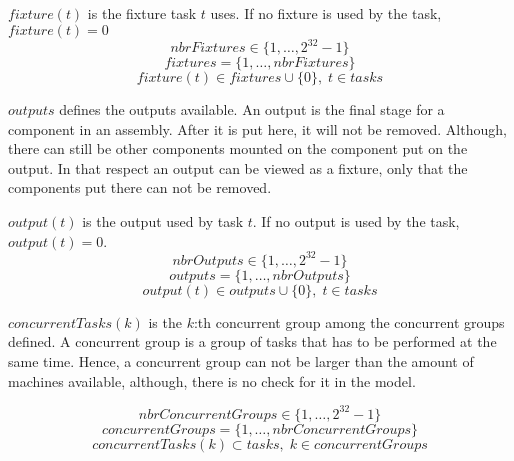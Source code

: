   $fixture(t)$ is the fixture task $t$ uses. If no fixture is used by the task, $fixture(t) = 0$
 \begin{equation}\label{eq:5}
 nbrFixtures \in \{1 , \ldots , 2^{32}-1\}
 \end{equation}
 \begin{equation}\label{eq:15}
 fixtures = \{1 , \ldots , nbrFixtures\}
 \end{equation}
 \begin{equation}\label{eq:24}
 fixture(t) \in fixtures \cup \{0\}, \; t \in tasks
 \end{equation}

  \noindent $outputs$ defines the outputs available. An output is the final stage for a component in an assembly. After it is put here, it will not be removed. Although, there can still be other components mounted on the component put on the output. In that respect an output can be viewed as a fixture, only that the components put there can not be removed.
 
 $output(t)$ is the output used by task $t$. If no output is used by the task, $output(t) = 0$.
 \begin{equation}\label{eq:7}
 nbrOutputs \in \{1 , \ldots , 2^{32}-1\}
 \end{equation}
 \begin{equation}\label{eq:16}
 outputs = \{1 , \ldots , nbrOutputs\}
 \end{equation}
 \begin{equation}\label{eq:23}
 output(t) \in outputs \cup \{0\}, \; t \in tasks
 \end{equation}

  \noindent $concurrentTasks(k)$ is the $k$:th concurrent group among the concurrent groups defined. A concurrent group is a group of tasks that has to be performed at the same time. Hence, a concurrent group can not be larger than the amount of machines available, although, there is no check for it in the model. 
    
 \begin{equation}\label{eq:8}
 nbrConcurrentGroups \in \{1 , \ldots , 2^{32}-1\}
 \end{equation}
 \begin{equation}\label{eq:17}
 concurrentGroups = \{1 , \ldots , nbrConcurrentGroups\}
 \end{equation}
 \begin{equation}\label{eq:30}
 concurrentTasks(k) \subset tasks, \; k \in concurrentGroups
 \end{equation}

